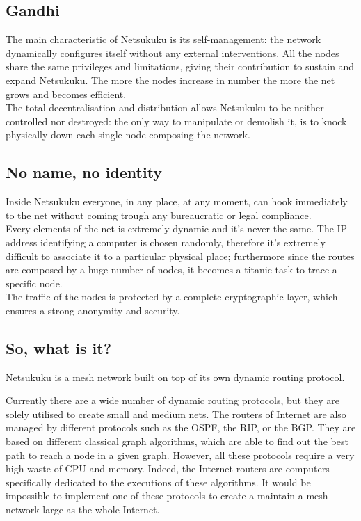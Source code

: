 \documentclass[a4paper]{article}
\begin{document}
\subsection{Gandhi}

The main characteristic of Netsukuku is its self-management: the network
dynamically configures itself without any external interventions.
All the nodes share the same privileges and limitations, giving their
contribution to sustain and expand Netsukuku.
The more the nodes increase in number the more the net grows and becomes
efficient.\\

The total decentralisation and distribution allows Netsukuku to be
neither controlled nor destroyed: the only way to manipulate or demolish
it, is to knock physically down each single node composing the network.

\subsection{No name, no identity}

Inside Netsukuku everyone, in any place, at any moment, can hook immediately
to the net without coming trough any bureaucratic or legal compliance.\\

Every elements of the net is extremely dynamic and it's never the same.
The IP address identifying a computer is chosen randomly, therefore it's
extremely difficult to associate it to a particular physical place; furthermore
since the routes are composed by a huge number of nodes, it becomes a titanic
task to trace a specific node.\\
The traffic of the nodes is protected by a complete cryptographic
layer\cite{carciofo}, which ensures a strong anonymity and security.

\subsection{So, what is it?}

Netsukuku is a mesh network built on top of its own dynamic routing protocol.

Currently there are a wide number of dynamic routing protocols, but they
are solely utilised to create small and medium nets.
The routers of Internet are also managed by different protocols such as the
OSPF, the RIP, or the BGP. They are based on different classical graph
algorithms, which are able to find out the best path to reach a node in a
given graph. However, all these protocols require a very high waste of CPU and
memory. Indeed, the Internet routers are computers specifically dedicated to
the executions of these algorithms. It would be impossible to implement one of
these protocols to create a maintain a mesh network large as the whole
Internet.
\end{document}
